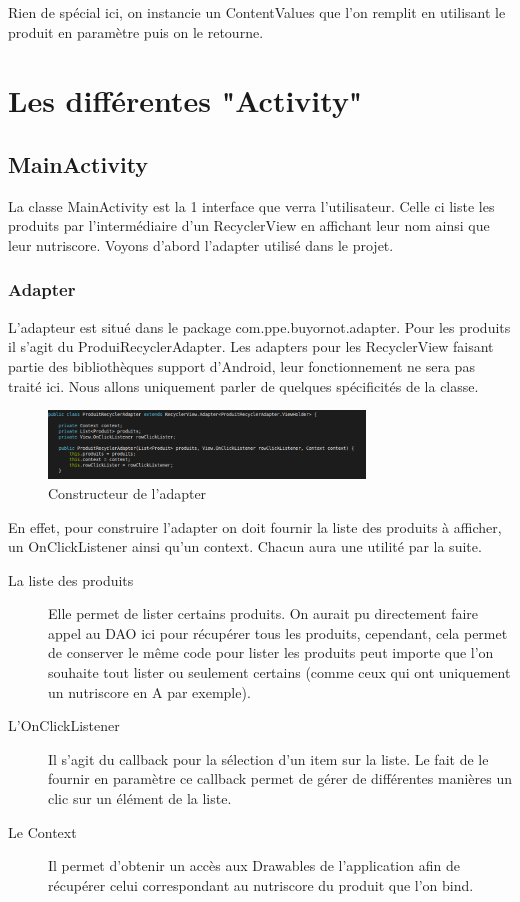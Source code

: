 \documentclass[report]{BetterDocument}
\begin{document}
			Rien de spécial ici, on instancie un ContentValues que l'on remplit en utilisant le produit en paramètre puis on le retourne.

	\chapter{Les différentes "Activity"}
		\section{MainActivity}

			La classe MainActivity est la 1\iere{} interface que verra l'utilisateur. Celle ci liste les produits par l'intermédiaire d'un RecyclerView en affichant leur nom ainsi que leur nutriscore. Voyons d'abord l'adapter utilisé dans le projet.

			\subsection{Adapter}

				L'adapteur est situé dans le package com.ppe.buyornot.adapter. Pour les produits il s'agit du ProduiRecyclerAdapter. Les adapters pour les RecyclerView faisant partie des bibliothèques support d'Android, leur fonctionnement ne sera pas traité ici. Nous allons uniquement parler de quelques spécificités de la classe.

				\begin{figure}[H]
					\centering\includegraphics[width=0.75\textwidth, keepaspectratio]{img/adapter/constructor.png}
					\caption{Constructeur de l'adapter}
				\end{figure}

				En effet, pour construire l'adapter on doit fournir la liste des produits à afficher, un OnClickListener ainsi qu'un context. Chacun aura une utilité par la suite.

				\begin{description}
					\item [La liste des produits] Elle permet de lister certains produits. On aurait pu directement faire appel au DAO ici pour récupérer tous les produits, cependant, cela permet de conserver le même code pour lister les produits peut importe que l'on souhaite tout lister ou seulement certains (comme ceux qui ont uniquement un nutriscore en A par exemple).
					\item [L'OnClickListener] Il s'agit du callback pour la sélection d'un item sur la liste. Le fait de le fournir en paramètre ce callback permet de gérer de différentes manières un clic sur un élément de la liste.
					\item[Le Context] Il permet d'obtenir un accès aux Drawables de l'application afin de récupérer celui correspondant au nutriscore du produit que l'on bind.
				\end{description}
\end{document}
